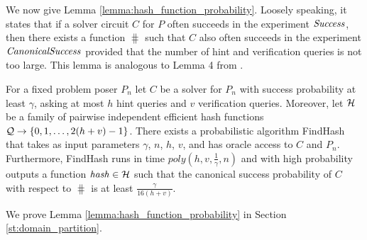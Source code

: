 We now give Lemma \ref{lemma:hash_function_probability}. Loosely speaking, it states that if a solver circuit $C$ for $P$
often succeeds in the experiment $\operatorname{\mathit{Success}}$, then there exists a function $\hash$ such that $C$ also
often succeeds in the experiment $\operatorname{\mathit{CanonicalSuccess}}$ provided that the number of hint and verification queries is not too large.
This lemma is analogous to Lemma 4 from \cite{dodis2009security}.

\begin{lemma}
\label{lemma:hash_function_probability}
For a fixed problem poser $P_n$ let $C$ be a solver for $P_n$ with success probability at least $\gamma$,
asking at most $h$ hint queries and $v$ verification queries.
Moreover, let $\mathcal{H}$ be a family of pairwise independent efficient hash functions $\mathcal{Q} \rightarrow \{0,1, \dots,2(h+v)-1\}$.
There exists a probabilistic algorithm FindHash that takes as input parameters $\gamma$, $n$, $h$, $v$, and has oracle access to $C$ and $P_n$.
Furthermore, FindHash runs in time $poly(h,v,\frac{1}{\gamma},n)$ and with high probability outputs a function $\operatorname{\mathit{hash}} \in \mathcal{H}$
such that the canonical success probability of $C$ with respect to $\hash$ is at least $\frac{\gamma}{16(h+v)}$.
\end{lemma}
We prove Lemma \ref{lemma:hash_function_probability} in Section \ref{st:domain_partition}.
%
